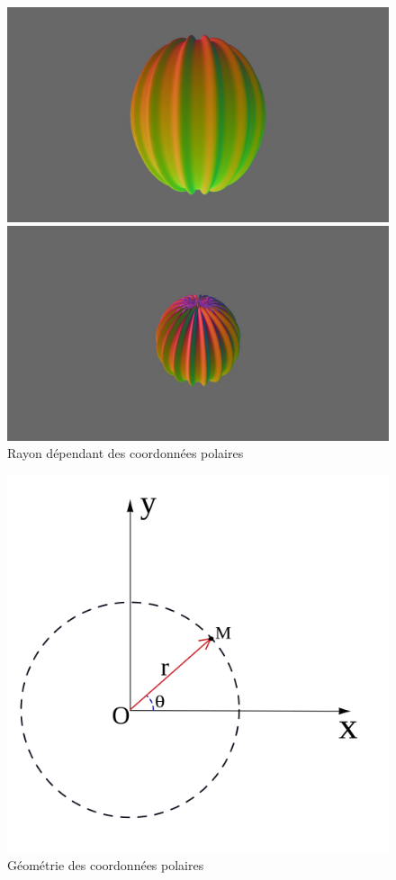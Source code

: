 \begin{figure}[h]
  \begin{minipage}[b]{0.45\linewidth}
    \centering
    \includegraphics[width=\linewidth]{images/meduse/meduse_04.JPG}
  \end{minipage}
  \hspace{0.1\linewidth} %
  \begin{minipage}[b]{0.45\linewidth}
    \centering
    \includegraphics[width=\linewidth]{images/meduse/meduse_05_01.JPG}
  \end{minipage}
    \caption{Rayon dépendant des coordonnées polaires}
    \label{meduse_05_01}
\end{figure}


\begin{figure}[h]
    \centering
    \includegraphics[width=0.5\linewidth]{images/shaders/coord_polar.png}
    \caption{Géométrie des coordonnées polaires}
    \label{coord_polar}
\end{figure}


